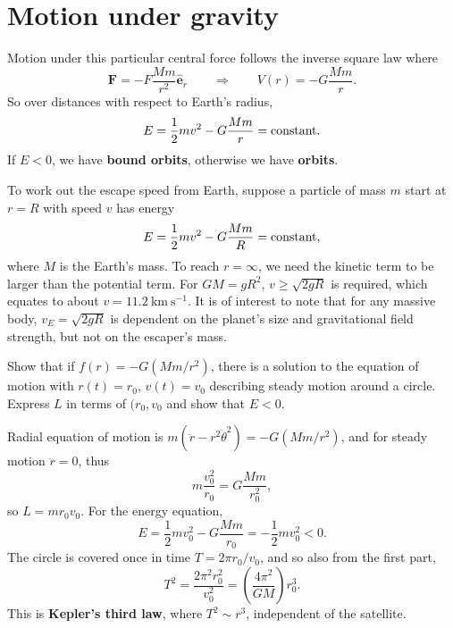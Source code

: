 \documentclass[letter-paper]{tufte-book}
\newenvironment{example}[1][Example]{\begin{trivlist}
\item[\hskip \labelsep {\bfseries #1}]}{\end{trivlist}}
\newcommand{\eb}{\boldsymbol{e}}
\newcommand{\Fb}{\boldsymbol{F}}
\newcommand\Def[1]{\textbf{#1}}
\begin{document}

\section{Motion under gravity}

Motion under this particular central force follows the inverse square law where
\begin{equation*}
  \Fb = -F\frac{Mm}{r^2} \hat{\eb}_r \qquad\Rightarrow\qquad
  V(r) = -G \frac{Mm}{r}.
\end{equation*}
So over distances with respect to Earth's radius,
\begin{equation*}
  E = \frac{1}{2}mv^2 - G\frac{Mm}{r} = \textnormal{constant}.
\end{equation*}
If $E<0$, we have \Def{bound orbits}, otherwise we have
\Def{orbits}.

\begin{example}
  To work out the escape speed from Earth, suppose a particle of mass $m$ start
  at $r = R$ with speed $v$ has energy
  \begin{equation*}
    E = \frac{1}{2}mv^2 - G\frac{Mm}{R} = \textnormal{constant},
  \end{equation*}
  where $M$ is the Earth's mass. To reach $r = \infty$, we need the kinetic term
  to be larger than the potential term. For $GM = gR^2$, $v\geq \sqrt{2gR}$ is
  required, which equates to about $v = 11.2\ \mathrm{km}\ \mathrm{s}^{-1}$. It
  is of interest to note that for any massive body, $v_{E} = \sqrt{2gR}$ is
  dependent on the planet's size and gravitational field strength, but not on
  the escaper's mass.
\end{example}

\begin{example}
  Show that if $f(r) = -G(Mm/r^2)$, there is a solution to the equation of
  motion with $r(t) = r_0$, $v(t) = v_0$ describing steady motion around a
  circle. Express $L$ in terms of $(r_0, v_0$ and show that $E < 0$.
  
  Radial equation of motion is $m(\ddot{r} - r^2 \dot{\theta}^2) = -G(Mm/r^2)$,
  and for steady motion $\ddot{r} = 0$, thus
  \begin{equation*}
    m\frac{v_0^2}{r_0} = G\frac{Mm}{r_0^2},
  \end{equation*}
  so $L = m r_0 v_0$. For the energy equation,
  \begin{equation*}
    E = \frac{1}{2} m v_0^2 - G\frac{Mm}{r_0} = -\frac{1}{2} m v_0^2 < 0.
  \end{equation*}
  The circle is covered once in time $T = 2\pi r_0 / v_0$, and so also from the
  first part,
  \begin{equation*}
    T^2 = \frac{2\pi^2 r_0^2}{v_0^2} = \left(\frac{4\pi^2}{GM}\right) r_0^3.
  \end{equation*}
  This is \Def{Kepler's third law}, where $T^2\sim r^3$, independent of
  the satellite.
\end{example}
\end{document}
